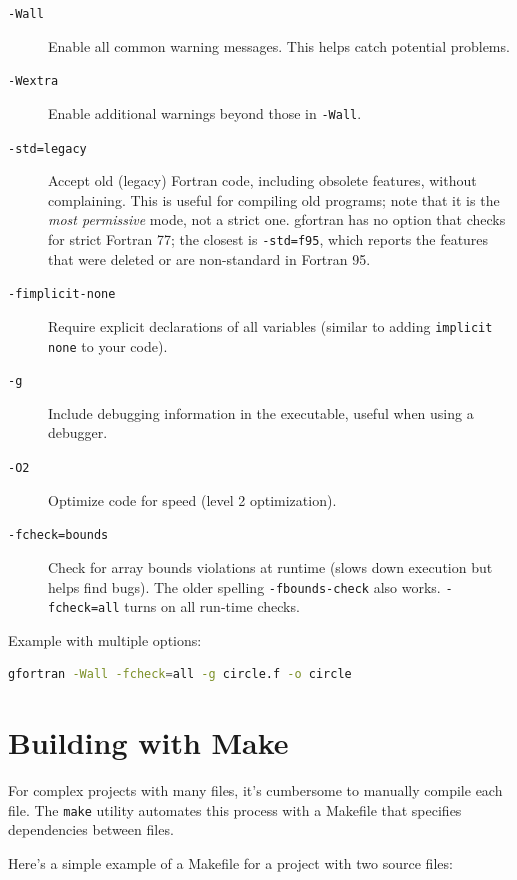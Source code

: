 \begin{description}
    \item[\texttt{-Wall}] Enable all common warning messages. This helps catch potential problems.
    
    \item[\texttt{-Wextra}] Enable additional warnings beyond those in \texttt{-Wall}.
    
    \item[\texttt{-std=legacy}] Accept old (legacy) Fortran code, including obsolete features, without complaining. This is useful for compiling old programs; note that it is the \emph{most permissive} mode, not a strict one. gfortran has no option that checks for strict Fortran 77; the closest is \texttt{-std=f95}, which reports the features that were deleted or are non-standard in Fortran 95.
    
    \item[\texttt{-fimplicit-none}] Require explicit declarations of all variables (similar to adding \texttt{implicit none} to your code).
    
    \item[\texttt{-g}] Include debugging information in the executable, useful when using a debugger.
    
    \item[\texttt{-O2}] Optimize code for speed (level 2 optimization).
    
    \item[\texttt{-fcheck=bounds}] Check for array bounds violations at runtime (slows down execution but helps find bugs). The older spelling \texttt{-fbounds-check} also works. \texttt{-fcheck=all} turns on all run-time checks.
\end{description}

Example with multiple options:

\begin{lstlisting}[language=bash]
gfortran -Wall -fcheck=all -g circle.f -o circle
\end{lstlisting}

\section{Building with Make}

For complex projects with many files, it's cumbersome to manually compile each file. The \texttt{make} utility automates this process with a Makefile that specifies dependencies between files.

Here's a simple example of a Makefile for a project with two source files:

